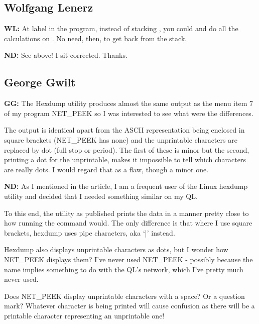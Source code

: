 \subsection{Wolfgang Lenerz}

\textbf{WL: }At label  in the  program, instead of stacking , you could  and do all the calculations on . No need, then, to get  back from the stack. 

\textbf{ND: }See above! I sit corrected. Thanks.


\subsection{George Gwilt}

\textbf{GG: }The Hexdump utility produces almost the same output as the menu item 7 of my program NET\_PEEK so I was interested to see what were the differences.

The output is identical apart from the ASCII representation being enclosed in square brackets (NET\_PEEK has none) and the unprintable characters are replaced by dot (full stop or period). The first of these is minor but the second, printing a dot for the unprintable, makes it impossible to tell which characters are really dots. I would regard that as a flaw, though a minor one.

\textbf{ND: }As I mentioned in the article, I am a frequent user of the Linux hexdump utility and decided that I needed something similar on my QL. 

To this end, the utility as published prints the data in a manner pretty close to how running the command  would. The only difference is that where I use square brackets, hexdump uses pipe characters, aka `|' instead.

Hexdump also displays unprintable characters as dots, but I wonder how NET\_PEEK displays them? I've never used NET\_PEEK - possibly because the name implies something to do with the QL's network, which I've pretty much never used.

Does NET\_PEEK display unprintable characters with a space? Or a question mark? Whatever character is being printed will cause confusion as there will be a printable character representing an unprintable one! 

